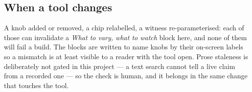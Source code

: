 \documentclass[11pt,a4paper]{article}
\begin{document}
\subsection*{When a tool changes}

A knob added or removed, a chip relabelled, a witness re-parameterised:
each of those can invalidate a \emph{What to vary, what to watch} block
here, and none of them will fail a build.  The blocks are written to name
knobs by their on-screen labels so a mismatch is at least visible to a
reader with the tool open.  Prose staleness is deliberately not gated in
this project --- a text search cannot tell a live claim from a recorded
one --- so the check is human, and it belongs in the same change that
touches the tool.
\end{document}
